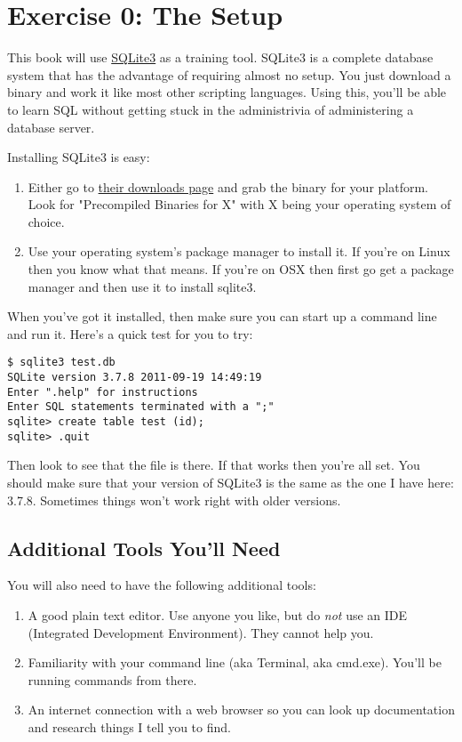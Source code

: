 \chapter{Exercise 0: The Setup}

This book will use \href{http://www.sqlite.org/download.html}{SQLite3} as a training
tool.  SQLite3 is a complete database system that has the advantage of requiring almost
no setup.  You just download a binary and work it like most other scripting languages.
Using this, you'll be able to learn SQL without getting stuck in the administrivia of
administering a database server.

Installing SQLite3 is easy:

\begin{enumerate}
\item Either go to \href{http://www.sqlite.org/download.html}{their downloads page}
    and grab the binary for your platform.  Look for "Precompiled Binaries for X" with
    X being your operating system of choice.
\item Use your operating system's package manager to install it.  If you're on Linux
    then you know what that means.  If you're on OSX then first go get a package
    manager and then use it to install sqlite3.
\end{enumerate}

When you've got it installed, then make sure you can start up a command line and 
run it.  Here's a quick test for you to try:

\begin{lstlisting}
$ sqlite3 test.db
SQLite version 3.7.8 2011-09-19 14:49:19
Enter ".help" for instructions
Enter SQL statements terminated with a ";"
sqlite> create table test (id);
sqlite> .quit
\end{lstlisting}

Then look to see that the  file is there.  If that works
then you're all set.  You should make sure that your version of SQLite3
is the same as the one I have here: 3.7.8.  Sometimes things won't work
right with older versions.

\section{Additional Tools You'll Need}

You will also need to have the following additional tools:

\begin{enumerate}
\item A good plain text editor.  Use anyone you like, but do \emph{not} use an IDE (Integrated Development Environment).  They cannot help you.
\item Familiarity with your command line (aka Terminal, aka cmd.exe).  You'll be running commands from there.
\item An internet connection with a web browser so you can look up documentation and research things I tell you to find.
\end{enumerate}

